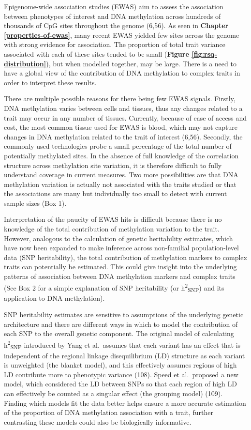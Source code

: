 \documentclass[11pt,twoside]{bristolthesis}
\begin{document}
Epigenome-wide association studies (EWAS) aim to assess the association between phenotypes of interest and DNA methylation across hundreds of thousands of CpG sites throughout the genome (6,56). As seen in \textbf{Chapter \ref{properties-of-ewas}}, many recent EWAS yielded few sites across the genome with strong evidence for association. The proportion of total trait variance associated with each of these sites tended to be small (\textbf{Figure \ref{fig:rsq-distribution}}), but when modelled together, may be large. There is a need to have a global view of the contribution of DNA methylation to complex traits in order to interpret these results.

There are multiple possible reasons for there being few EWAS signals. Firstly, DNA methylation varies between cells and tissues, thus any changes related to a trait may occur in any number of tissues. Currently, because of ease of access and cost, the most common tissue used for EWAS is blood, which may not capture changes in DNA methylation related to the trait of interest (6,56). Secondly, the commonly used technologies probe a small percentage of the total number of potentially methylated sites. In the absence of full knowledge of the correlation structure across methylation site variation, it is therefore difficult to fully understand coverage in current measures. Two more possibilities are that DNA methylation variation is actually not associated with the traits studied or that the associations are many but individually too small to detect with current sample sizes (Box 1).

Interpretation of the paucity of EWAS hits is difficult because there is no knowledge of the total contribution of methylation variation to the trait. However, analogous to the calculation of genetic heritability estimates, which have now been expanded to make inference across non-familial population-level data (SNP heritability), the total contribution of methylation markers to complex traits can potentially be estimated. This could give insight into the underlying patterns of association between DNA methylation markers and complex traits (See Box 2 for a simple explanation of SNP heritability (or h\textsuperscript{2}\textsubscript{SNP}) and its application to DNA methylation).

SNP heritability estimates are sensitive to assumptions of the underlying genetic architecture and there are different ways in which to model the contribution of each SNP to the overall genetic component. The original model of calculating h\textsuperscript{2}\textsubscript{SNP} introduced by Yang et al.~assumes that each variant has an effect that is independent of the regional linkage disequilibrium (LD) structure as each variant is unweighted (the blanket model), and this effectively assumes regions of high LD contribute more to phenotypic variance (108). Speed et al.~proposed a new model, which considered the LD between SNPs so that each region of high LD can effectively be counted as a singular effect (the grouping model) (109). Finding which models fit the data better helps ensure a more accurate estimation of the proportion of DNA methylation association with a trait, further contrasting these models could also be biologically informative.
\end{document}
